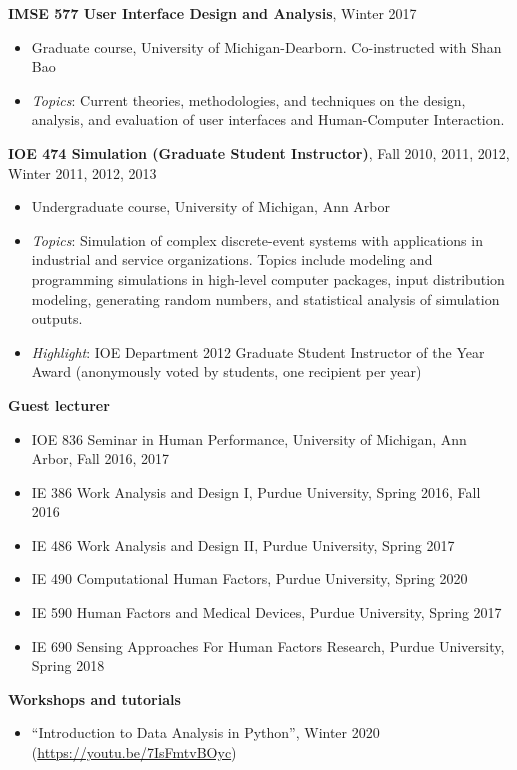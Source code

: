 \documentclass[11pt]{article}
\newenvironment{main}
{\begin{adjustwidth}{3em}{}}
{\end{adjustwidth}}
\begin{document}
\begin{main}
\textbf{IMSE 577 User Interface Design and Analysis}, Winter 2017

\begin{itemize}
    \item[] Graduate course, University of Michigan-Dearborn. Co-instructed with Shan Bao
    \item[] \textit{Topics}: Current theories, methodologies, and techniques on the design, analysis, and evaluation of user interfaces and Human-Computer Interaction. 
\end{itemize}


\textbf{IOE 474 Simulation (Graduate Student Instructor)}, Fall 2010, 2011, 2012, Winter 2011, 2012, 2013

\begin{itemize}
    \item[] Undergraduate course, University of Michigan, Ann Arbor
    \item[] \textit{Topics}: Simulation of complex discrete-event systems with applications in industrial and service organizations. Topics include modeling and programming simulations in high-level computer packages, input distribution modeling, generating random numbers, and statistical analysis of simulation outputs.
    \item[] \textit{Highlight}: IOE Department 2012 Graduate Student Instructor of the Year Award (anonymously voted by students, one recipient per year)
\end{itemize}

\textbf{Guest lecturer}

\begin{itemize}
    \item IOE 836 Seminar in Human Performance, University of Michigan, Ann Arbor, Fall 2016, 2017
    \item IE 386 Work Analysis and Design I, Purdue University, Spring 2016, Fall 2016
    \item IE 486 Work Analysis and Design II, Purdue University, Spring 2017
    \item IE 490 Computational Human Factors, Purdue University, Spring 2020
    \item IE 590 Human Factors and Medical Devices, Purdue University, Spring 2017
    \item IE 690 Sensing Approaches For Human Factors Research, Purdue University, Spring 2018
\end{itemize}


\textbf{Workshops and tutorials}

\begin{itemize}
    \item “Introduction to Data Analysis in Python”, Winter 2020 (\url{https://youtu.be/7IsFmtvBOyc})
\end{itemize}


\end{main}
\end{document}
